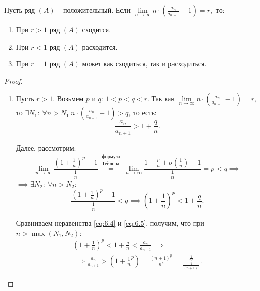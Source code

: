 

\begin{theorem}
    Пусть ряд $(A)$ -- положительный. Если $ \underset{n\rightarrow\infty}{\lim}n \cdot \left(\frac{a_n}{a_{n+1}} - 1\right) = r, $ то:
    \begin{enumerate}
        \item При $r>1$ ряд $(A)$ сходится.
        \item При $r<1$ ряд $(A)$ расходится.
        \item При $r=1$ ряд $(A)$ может как сходиться, так и расходиться.
    \end{enumerate}
\end{theorem}

\begin{proof}\leavevmode
    \begin{enumerate}
        \item Пусть $r>1$. Возьмем $p$ и $q$: $ 1 < p < q < r $. Так как $ \underset{n\rightarrow\infty}{\lim}n\cdot\left(\frac{a_n}{a_{n+1}} - 1\right) = r, $ то $\exists N_1: \ \forall n > N_1 \ n\cdot\left(\frac{a_n}{a_{n+1}} - 1\right) > q$, то есть:
              \begin{equation}\label{eq:6.4}
                  \frac{a_n}{a_{n+1}} > 1 + \frac{q}{n}.
              \end{equation}

              Далее, рассмотрим:
              \[
                  \underset{n\rightarrow\infty}{\lim}\frac{(1 + \frac{1}{n})^p - 1}{\frac{1}{n}} \overset{\begin{array}{c}
                          \text{формула} \\
                          \text{Тейлора}
                      \end{array}}{=} \underset{n\rightarrow\infty}{\lim}\frac{1 + \frac{p}{n} + o(\frac{1}{n}) - 1}{\frac{1}{n}} = p < q \implies
              \]
              $\implies \exists N_2: \ \forall n > N_2$:
              \begin{equation}\label{eq:6.5}
                  \frac{(1 + \frac{1}{n})^p - 1}{\frac{1}{n}} < q \implies \left(1 + \frac{1}{n}\right)^p < 1 + \frac{q}{n}.
              \end{equation}

              Сравниваем неравенства \ref{eq:6.4} и \ref{eq:6.5}, получим, что при \\
              $n > \max(N_1,N_2)$:
              \begin{multline*}
                  \left(1 + \frac{1}{n}\right)^p < 1 + \frac{q}{n} < \frac{a_n}{a_{n+1}} \implies \\
                  \implies \frac{a_n}{a_{n+1}} > \left(1 + \frac{1}{n}^p\right) = \frac{(n+1)^p}{n^p} = \frac{\frac{1}{n^p}}{\frac{1}{(n+1)^p}}.
              \end{multline*}


\end{enumerate}
\end{proof}

